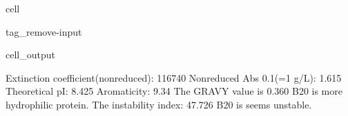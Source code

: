 \documentclass[letterpaper,10pt,english]{jupyterBook}
\begin{document}
\begin{sphinxuseclass}{cell}
\begin{sphinxuseclass}{tag_remove-input}
\begin{sphinxVerbatimOutput}
\begin{sphinxuseclass}{cell_output}
\begin{sphinxVerbatim}[commandchars=\\\{\}]
\PYGZsh{} Extinction coefficient(non\PYGZhy{}reduced): \PYGZhy{}\PYGZhy{}\PYGZhy{}\PYGZhy{}\PYGZhy{}\PYGZhy{}\PYGZhy{}\PYGZhy{}\PYGZhy{}\PYGZhy{}\PYGZhy{}\PYGZhy{}\PYGZhy{}\PYGZhy{}\PYGZhy{}\PYGZhy{}\PYGZhy{}\PYGZhy{}\PYGZhy{}\PYGZhy{}\PYGZhy{}116740
\PYGZsh{} Non\PYGZhy{}reduced Abs 0.1\PYGZpc{}(=1 g/L): \PYGZhy{}\PYGZhy{}\PYGZhy{}\PYGZhy{}\PYGZhy{}\PYGZhy{}\PYGZhy{}\PYGZhy{}\PYGZhy{}\PYGZhy{}\PYGZhy{}\PYGZhy{}\PYGZhy{}\PYGZhy{}\PYGZhy{}\PYGZhy{}\PYGZhy{}\PYGZhy{}\PYGZhy{}\PYGZhy{}\PYGZhy{}\PYGZhy{}\PYGZhy{}\PYGZhy{}\PYGZhy{}\PYGZhy{}\PYGZhy{}\PYGZhy{}\PYGZhy{}1.615
\PYGZsh{} Theoretical pI: \PYGZhy{}\PYGZhy{}\PYGZhy{}\PYGZhy{}\PYGZhy{}\PYGZhy{}\PYGZhy{}\PYGZhy{}\PYGZhy{}\PYGZhy{}\PYGZhy{}\PYGZhy{}\PYGZhy{}\PYGZhy{}\PYGZhy{}\PYGZhy{}\PYGZhy{}\PYGZhy{}\PYGZhy{}\PYGZhy{}\PYGZhy{}\PYGZhy{}\PYGZhy{}\PYGZhy{}\PYGZhy{}\PYGZhy{}\PYGZhy{}\PYGZhy{}\PYGZhy{}\PYGZhy{}\PYGZhy{}\PYGZhy{}\PYGZhy{}\PYGZhy{}\PYGZhy{}\PYGZhy{}\PYGZhy{}\PYGZhy{}\PYGZhy{}\PYGZhy{}\PYGZhy{}\PYGZhy{}\PYGZhy{}8.425
\PYGZsh{} Aromaticity: \PYGZhy{}\PYGZhy{}\PYGZhy{}\PYGZhy{}\PYGZhy{}\PYGZhy{}\PYGZhy{}\PYGZhy{}\PYGZhy{}\PYGZhy{}\PYGZhy{}\PYGZhy{}\PYGZhy{}\PYGZhy{}\PYGZhy{}\PYGZhy{}\PYGZhy{}\PYGZhy{}\PYGZhy{}\PYGZhy{}\PYGZhy{}\PYGZhy{}\PYGZhy{}\PYGZhy{}\PYGZhy{}\PYGZhy{}\PYGZhy{}\PYGZhy{}\PYGZhy{}\PYGZhy{}\PYGZhy{}\PYGZhy{}\PYGZhy{}\PYGZhy{}\PYGZhy{}\PYGZhy{}\PYGZhy{}\PYGZhy{}\PYGZhy{}\PYGZhy{}\PYGZhy{}\PYGZhy{}\PYGZhy{}\PYGZhy{}\PYGZhy{}\PYGZhy{}9.34\PYGZpc{}
\PYGZsh{} The GRAVY value is \PYGZhy{}\PYGZhy{}\PYGZhy{}\PYGZhy{}\PYGZhy{}\PYGZhy{}\PYGZhy{}\PYGZhy{}\PYGZhy{}\PYGZhy{}\PYGZhy{}\PYGZhy{}\PYGZhy{}\PYGZhy{}\PYGZhy{}\PYGZhy{}\PYGZhy{}\PYGZhy{}\PYGZhy{}\PYGZhy{}\PYGZhy{}\PYGZhy{}\PYGZhy{}\PYGZhy{}\PYGZhy{}\PYGZhy{}\PYGZhy{}\PYGZhy{}\PYGZhy{}\PYGZhy{}\PYGZhy{}\PYGZhy{}\PYGZhy{}\PYGZhy{}\PYGZhy{}\PYGZhy{}\PYGZhy{}\PYGZhy{}\PYGZhy{}\PYGZhy{}0.360
  B20 is more hydrophilic protein.
\PYGZsh{} The instability index: \PYGZhy{}\PYGZhy{}\PYGZhy{}\PYGZhy{}\PYGZhy{}\PYGZhy{}\PYGZhy{}\PYGZhy{}\PYGZhy{}\PYGZhy{}\PYGZhy{}\PYGZhy{}\PYGZhy{}\PYGZhy{}\PYGZhy{}\PYGZhy{}\PYGZhy{}\PYGZhy{}\PYGZhy{}\PYGZhy{}\PYGZhy{}\PYGZhy{}\PYGZhy{}\PYGZhy{}\PYGZhy{}\PYGZhy{}\PYGZhy{}\PYGZhy{}\PYGZhy{}\PYGZhy{}\PYGZhy{}\PYGZhy{}\PYGZhy{}\PYGZhy{}\PYGZhy{}47.726
  B20 is seems unstable.
\end{sphinxVerbatim}

\end{sphinxuseclass}\end{sphinxVerbatimOutput}

\end{sphinxuseclass}
\end{sphinxuseclass}
\end{document}
